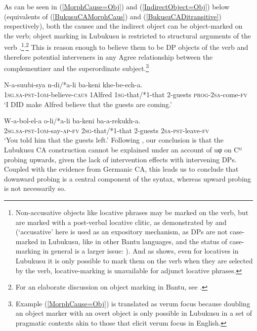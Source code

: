 \documentclass[output=paper
,modfonts
,nonflat
]{langsci/langscibook}
\begin{document}
\z
\noindent As can be seen in (\ref{MorphCause=Obj}) and (\ref{IndirectObject=Obj}) below (equivalents of (\ref{BukusuCAMorphCaus}) and (\ref{BukusuCADitransitive}) respectively), both the causee and the indirect object can be object-marked on the verb; object marking in Lubukusu is restricted to structural arguments of the verb \citep{Diercks:2011,SikukuEt:2017}.\footnote{Non-accusative objects like locative phrases may be marked on the verb, but are marked with a post-verbal locative clitic, as demonstrated by \citet{Diercks:2010,Diercks:2011} and \citet{SikukuEt:2017} (`accusative' here is used as an expository mechanism, as DPs are not case-marked in Lubukusu, like in other Bantu languages, and the status of case-marking in general is a larger issue: \citealt{Harford:1985,Halpert:2012,Diercks:2012,vanderwal:2015}). And as \citet{Diercks:2011} shows, even for locatives in Lubukusu it is only possible to mark them on the verb when they are selected by the verb, locative-marking is unavailable for adjunct locative phrases.}\textsuperscript{\textrm{,}}\footnote{For an elaborate discussion on object marking in Bantu, see .} This is reason enough to believe them to be DP objects of the verb and therefore potential interveners in any Agree relationship between the complementizer and the superordinate subject.\footnote{Example (\ref{MorphCause=Obj}) is translated as verum focus because doubling an object marker with an overt object is only possible in Lubukusu in a set of pragmatic contexts akin to those that elicit verum focus in English.}
\newpage 

\ea \label{MorphCause=Obj}
\gll N-a-suubi-sya  n-di/*a-li ba-keni khe-be-ech-a.	\\
1\textsc{sg}.\textsc{sa}-\textsc{pst}-1\textsc{om}-believe-\textsc{caus} 1Alfred 1\textsc{sg}-that/*1-that 2-guests \textsc{prog}-2\textsc{sa}-come-\textsc{fv} \\
\glt `I DID make Alfred believe that the guests are coming.'
\z

\ea \label{IndirectObject=Obj}
\gll W-a-bol-el-a o-li/*a-li ba-keni ba-a-rekukh-a. \\
2\textsc{sg}.\textsc{sa}-\textsc{pst}-1\textsc{om}-say-\textsc{ap}-\textsc{fv} {2\textsc{sg}-that/*1-that} 2-guests 2\textsc{sa}-\textsc{pst}-leave-\textsc{fv} \\
\glt `You told him that the guests left.'
\z
\noindent Following \citet{Diercks:2013}, our conclusion is that the Lubukusu CA construction cannot be explained under an account of uφ on Cº probing upwards, given the lack of intervention effects with intervening DPs. Coupled with the evidence from Germanic CA, this leads us to conclude that downward probing is a central component of the syntax, whereas upward probing is not necessarily so.  
\end{document}
